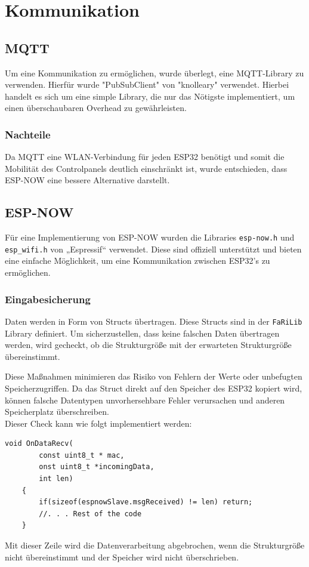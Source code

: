 \section{Kommunikation}
    \subsection{MQTT}
    Um eine Kommunikation zu ermöglichen, wurde überlegt, 
    eine MQTT-Library zu verwenden. Hierfür wurde "PubSubClient" von 
    "knolleary" verwendet. Hierbei handelt es sich um eine 
    simple Library, die nur das Nötigste implementiert, um
    einen überschaubaren Overhead zu gewährleisten.
        \subsubsection{Nachteile}
        Da MQTT eine WLAN-Verbindung für jeden ESP32
        benötigt und somit die Mobilität des Controlpanels
        deutlich einschränkt ist, wurde entschieden, dass 
        ESP-NOW eine bessere Alternative darstellt.
    
    \subsection{ESP-NOW}
    Für eine Implementierung von ESP-NOW wurden die Libraries
    \texttt{esp-now.h} und \texttt{esp\_wifi.h} von
    „Espressif“ verwendet. Diese sind offiziell unterstützt
    und bieten eine einfache Möglichkeit, um eine Kommunikation
    zwischen ESP32's zu ermöglichen.

        \subsubsection{Eingabesicherung}
        Daten werden in Form von Structs übertragen. Diese Structs
        sind in der \texttt{FaRiLib} Library definiert. Um sicherzustellen,
        dass keine falschen Daten übertragen werden, wird gecheckt, ob die
        Strukturgröße mit der erwarteten Strukturgröße übereinstimmt. \par
        Diese Maßnahmen minimieren das Risiko von Fehlern der Werte oder unbefugten 
        Speicherzugriffen. Da das Struct direkt auf den Speicher des ESP32
        kopiert wird, können falsche Datentypen unvorhersehbare Fehler
        verursachen und anderen Speicherplatz überschreiben. \\

        Dieser Check kann wie folgt implementiert werden:
        \begin{lstlisting}[style=cppCode]
    void OnDataRecv(
        const uint8_t * mac, 
        onst uint8_t *incomingData, 
        int len) 
    {
        if(sizeof(espnowSlave.msgReceived) != len) return;
        //. . . Rest of the code
    }
        \end{lstlisting}
    
        Mit dieser Zeile wird die Datenverarbeitung abgebrochen,
        wenn die Strukturgröße nicht 
        übereinstimmt und der Speicher wird nicht überschrieben.